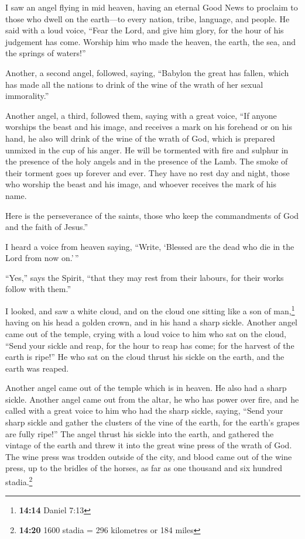  I saw an angel flying in mid heaven, having an eternal
Good News to proclaim to those who dwell on the earth---to every nation,
tribe, language, and people.  He said with a loud voice,
``Fear the Lord, and give him glory, for the hour of his judgement has
come. Worship him who made the heaven, the earth, the sea, and the
springs of waters!''

 Another, a second angel, followed, saying, ``Babylon the
great has fallen, which has made all the nations to drink of the wine of
the wrath of her sexual immorality.''

 Another angel, a third, followed them, saying with a
great voice, ``If anyone worships the beast and his image, and receives
a mark on his forehead or on his hand,  he also will
drink of the wine of the wrath of God, which is prepared unmixed in the
cup of his anger. He will be tormented with fire and sulphur in the
presence of the holy angels and in the presence of the Lamb.
 The smoke of their torment goes up forever and ever.
They have no rest day and night, those who worship the beast and his
image, and whoever receives the mark of his name.

 Here is the perseverance of the saints, those who keep
the commandments of God and the faith of Jesus.''

 I heard a voice from heaven saying, ``Write, `Blessed
are the dead who die in the Lord from now on.'\,''

``Yes,'' says the Spirit, ``that they may rest from their labours, for
their works follow with them.''

 I looked, and saw a white cloud, and on the cloud one
sitting like a son of man,\footnote{\textbf{14:14} Daniel 7:13} having
on his head a golden crown, and in his hand a sharp sickle.
 Another angel came out of the temple, crying with a loud
voice to him who sat on the cloud, ``Send your sickle and reap, for the
hour to reap has come; for the harvest of the earth is ripe!''
 He who sat on the cloud thrust his sickle on the earth,
and the earth was reaped.

 Another angel came out of the temple which is in heaven.
He also had a sharp sickle.  Another angel came out from
the altar, he who has power over fire, and he called with a great voice
to him who had the sharp sickle, saying, ``Send your sharp sickle and
gather the clusters of the vine of the earth, for the earth's grapes are
fully ripe!''  The angel thrust his sickle into the
earth, and gathered the vintage of the earth and threw it into the great
wine press of the wrath of God.  The wine press was
trodden outside of the city, and blood came out of the wine press, up to
the bridles of the horses, as far as one thousand and six hundred
stadia.\footnote{\textbf{14:20} 1600 stadia = 296 kilometres or 184
  miles}

